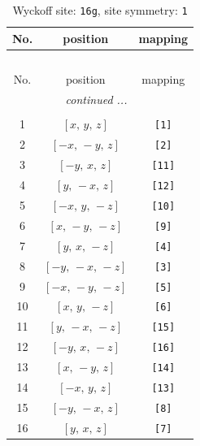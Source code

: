 \documentclass[fleqn,8pt]{jsarticle}
\begin{document}
\renewcommand{\arraystretch}{1.2}
\begin{longtable}{ccc}
\caption{Wyckoff site: {\tt 16g}, site symmetry: {\tt 1}}
 \\
 \hline \hline
No. & position & mapping \\ \hline \endfirsthead

\multicolumn{2}{l}{\tablename\ \thetable{}} \\
 \hline \hline
No. & position & mapping \\ \hline \endhead

 \hline \hline
\multicolumn{2}{r}{\footnotesize\it continued ...} \\ \endfoot

 \hline \hline
\multicolumn{2}{r}{} \\ \endlastfoot

1 & $\left[ x,\, y,\, z \right]$ & {\tt [1]} \\ \hline
2 & $\left[ - x,\, - y,\, z \right]$ & {\tt [2]} \\ \hline
3 & $\left[ - y,\, x,\, z \right]$ & {\tt [11]} \\ \hline
4 & $\left[ y,\, - x,\, z \right]$ & {\tt [12]} \\ \hline
5 & $\left[ - x,\, y,\, - z \right]$ & {\tt [10]} \\ \hline
6 & $\left[ x,\, - y,\, - z \right]$ & {\tt [9]} \\ \hline
7 & $\left[ y,\, x,\, - z \right]$ & {\tt [4]} \\ \hline
8 & $\left[ - y,\, - x,\, - z \right]$ & {\tt [3]} \\ \hline
9 & $\left[ - x,\, - y,\, - z \right]$ & {\tt [5]} \\ \hline
10 & $\left[ x,\, y,\, - z \right]$ & {\tt [6]} \\ \hline
11 & $\left[ y,\, - x,\, - z \right]$ & {\tt [15]} \\ \hline
12 & $\left[ - y,\, x,\, - z \right]$ & {\tt [16]} \\ \hline
13 & $\left[ x,\, - y,\, z \right]$ & {\tt [14]} \\ \hline
14 & $\left[ - x,\, y,\, z \right]$ & {\tt [13]} \\ \hline
15 & $\left[ - y,\, - x,\, z \right]$ & {\tt [8]} \\ \hline
16 & $\left[ y,\, x,\, z \right]$ & {\tt [7]} \\
\end{longtable}
\end{document}
